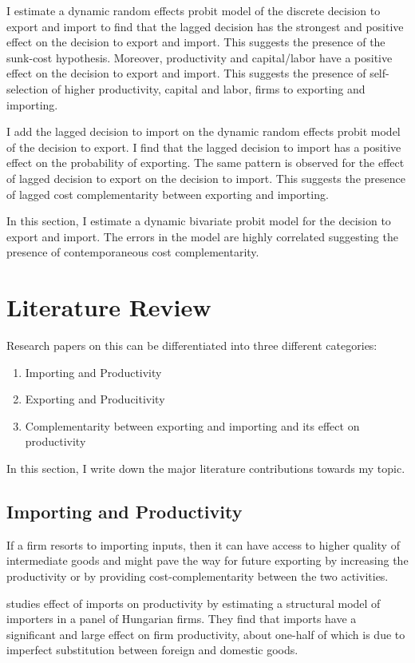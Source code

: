 \documentclass[12pt]{article}
\begin{document}
  I estimate a dynamic random effects probit model of the discrete
decision to export and import to find that the lagged decision has the
strongest and positive effect on the decision to export and
import. This suggests the presence of the sunk-cost
hypothesis. Moreover, productivity and capital/labor have a positive
effect on the decision to export and import. This suggests the
presence of self-selection of higher productivity, capital and labor,  firms to exporting
and importing. 

I add the lagged decision to import on the dynamic random effects
probit model  of the decision to export. I find that the lagged
decision to import has a positive effect on the probability of
exporting. The same pattern is observed for the effect of lagged
decision to export on the decision to import. This suggests the
presence of lagged cost complementarity between exporting and
importing. 

 In this section, I estimate a dynamic bivariate probit model for the decision to export
and import. The errors in the model are highly correlated suggesting
the presence of contemporaneous cost complementarity. 

\section{Literature Review}\label{sec:lit}
Research papers on this can be differentiated into three different
categories:
\begin{enumerate}
\item Importing and Productivity 
\item Exporting and Producitivity
\item Complementarity between exporting and importing and its effect
  on productivity
\end{enumerate}
In this section, I write down the major literature contributions
towards my topic. 

\subsection*{Importing and Productivity}

If a firm resorts to importing inputs, then it can have access to
higher quality of intermediate goods and might pave the way for future
exporting by increasing the productivity or by providing
cost-complementarity between the two activities.  

\textcite{halpern2011imported} studies effect of imports on productivity by estimating a structural
model of importers in a panel of Hungarian firms. They find that imports have
a significant and large effect on firm productivity, about one-half of which is due
to imperfect substitution between foreign and domestic goods. 
\end{document}
